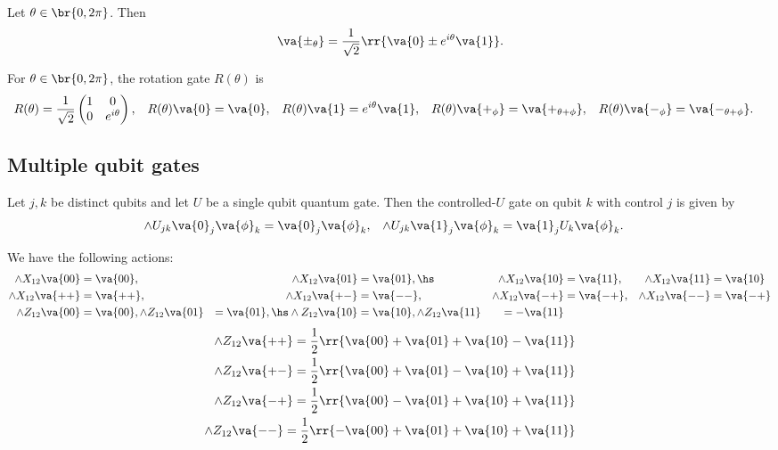 \documentclass{article}
\begin{document}
\begin{definition}
  Let $\theta\in\br{0,2\pi}$. Then
  \begin{align*}
    \va{\pm_\theta} = \frac{1}{\sqrt 2} \rr{\va{0}\pm e^{i\theta}\va{1}}.
  \end{align*}
\end{definition}


\begin{definition}
  For $\theta\in\br{0,2\pi}$, the rotation gate $R(\theta)$ is
  \begin{align*}
    R(\theta) &= \frac{1}{\sqrt{2}}
    \begin{pmatrix}
      1 & 0 \\
      0 & e^{i\theta}
    \end{pmatrix},&
    R(\theta)\va{0} &=\va{0},&
    R(\theta)\va{1} &=e^{i\theta}\va{1},&
    R(\theta)\va{+_\phi} &=\va{+_{\theta+\phi}},&
    R(\theta)\va{-_\phi} &=\va{-_{\theta+\phi}}.
  \end{align*}

\end{definition}

\subsection{Multiple qubit gates}
\label{sec:multiple-qubit-gates}

\begin{definition}
  \label{def:controlled-u}
  Let $j,k$ be distinct qubits and let $U$ be a single qubit quantum gate.
  Then the controlled-$U$ gate on qubit $k$ with control $j$ is
  given by
  \begin{align*}
    \wedge U_{jk}\va{0}_j\va{\phi}_k &= \va{0}_j\va{\phi}_k,&
    \wedge U_{jk}\va{1}_j\va{\phi}_k &= \va{1}_j U_k\va{\phi}_k.
  \end{align*}
\end{definition}

\begin{lemma}
  We have the following actions:
  \begin{align*}
    \wedge X_{12}\va{00} &= \va{00},
     &\wedge X_{12}\va{01} &= \va{01},\hs
     &\wedge X_{12}\va{10} &= \va{11},
     &\wedge X_{12}\va{11} &= \va{10}\\
     \wedge X_{12}\va{++} &= \va{++},
     &\wedge X_{12}\va{+-} &= \va{--},
     &\wedge X_{12}\va{-+} &= \va{-+},
     &\wedge X_{12}\va{--} &= \va{-+}\\
    \wedge Z_{12}\va{00} &= \va{00},
     \wedge Z_{12}\va{01} &= \va{01},\hs
     \wedge Z_{12}\va{10} &= \va{10},
     \wedge Z_{12}\va{11} &= -\va{11}
   \end{align*}
   \begin{align*}
     \wedge Z_{12}\va{++} = \frac{1}{2}\rr{\va{00}+\va{01}+\va{10}-\va{11}}\\
     \wedge Z_{12}\va{+-} = \frac{1}{2}\rr{\va{00}+\va{01}-\va{10}+\va{11}}\\
     \wedge Z_{12}\va{-+} = \frac{1}{2}\rr{\va{00}-\va{01}+\va{10}+\va{11}}\\
     \wedge Z_{12}\va{--} = \frac{1}{2}\rr{-\va{00}+\va{01}+\va{10}+\va{11}}
  \end{align*}
\end{lemma}
\end{document}
